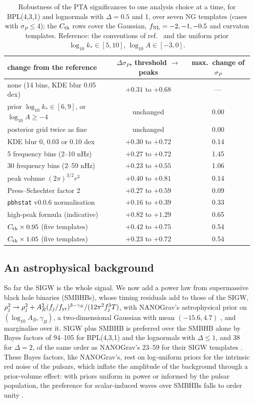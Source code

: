 \documentclass[a4paper,11pt]{article}
\newcommand{\fnl}{f_{\rm NL}}
\begin{document}
\begin{table}[t]
\centering\small
\begin{tabular}{lcc}
\toprule
change from the reference & $\Delta\sigma_P$, threshold $\to$ peaks & max.\ change of $\sigma_P$\\
\midrule
none (14 bins, KDE blur 0.05 dex) & $+0.31$ to $+0.68$ & ---\\
prior $\log_{10}k_*\in[6,9]$, or $\log_{10}A\ge-4$ & unchanged & 0.00\\
posterior grid twice as fine & unchanged & 0.00\\
KDE blur 0, 0.03 or 0.10 dex & $+0.30$ to $+0.72$ & 0.14\\
5 frequency bins (2--10 nHz) & $+0.27$ to $+0.72$ & 1.45\\
30 frequency bins (2--59 nHz) & $+0.23$ to $+0.55$ & 1.06\\
peak volume $(2\pi)^{3/2}r^3$ & $+0.40$ to $+0.81$ & 0.14\\
Press--Schechter factor 2 & $+0.27$ to $+0.59$ & 0.09\\
\texttt{pbhstat} v0.0.6 normalisation & $+0.16$ to $+0.39$ & 0.33\\
high-peak formula \cite{Iovino24} (indicative) & $+0.82$ to $+1.29$ & 0.65\\
$C_{\rm th}\times0.95$ (five templates) & $+0.42$ to $+0.75$ & 0.54\\
$C_{\rm th}\times1.05$ (five templates) & $+0.23$ to $+0.72$ & 0.54\\
\bottomrule
\end{tabular}
\caption{Robustness of the PTA significances to one analysis choice at a time, for BPL(4,3,1)
and lognormals with $\Delta=0.5$ and 1, over seven NG templates (cases with $\sigma_P\le4$); the
$C_{\rm th}$ rows cover the Gaussian, $\fnl=-2,-1,-0.5$ and curvaton templates. Reference: the
conventions of ref.~\cite{FIVT23} and the uniform prior $\log_{10}k_*\in[5,10]$,
$\log_{10}A\in[-3,0]$.}
\label{tab:robust}
\end{table}

\subsection{An astrophysical background}\label{sec:smbhb}

So far the SIGW is the whole signal. We now add a power law from supermassive black hole binaries
(SMBHBs), whose timing residuals add to those of the SIGW,
$\rho_j^2\to\rho_j^2+A_B^2(f_j/f_{\rm yr})^{3-\gamma_B}/(12\pi^2f_j^3T)$, with NANOGrav's
astrophysical prior on $(\log_{10}A_B,\gamma_B)$, a two-dimensional Gaussian with mean
$(-15.6,4.7)$ \cite{NG15np}, and marginalise over it. SIGW plus SMBHB is preferred over the SMBHB
alone by Bayes factors of 94--105 for BPL(4,3,1) and the lognormals with $\Delta\le1$, and 38 for
$\Delta=2$, of the same order as NANOGrav's 23--59 for their SIGW templates \cite{NG15np}. These
Bayes factors, like NANOGrav's, rest on log-uniform priors for the intrinsic red noise of the
pulsars, which inflate the amplitude of the background through a prior-volume effect: with priors
uniform in power or informed by the pulsar population, the preference for scalar-induced waves over
SMBHBs falls to order unity \cite{DZA26}.
\end{document}

